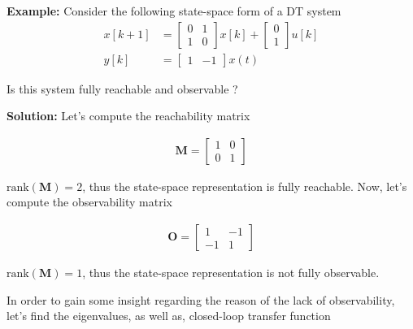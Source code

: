 \documentclass[twoside]{article}
\begin{document}
\newpage

\textbf{Example:} Consider the following state-space form of a
DT system 
%
\begin{align*}
x[k+1] &= 
\left[ \begin{array}{cc} 0 & 1 \\ 1 & 0 \end{array} \right]
x[k]
+
\left[ \begin{array}{c} 0 \\ 1 \end{array} \right] u[k]
\\
y[k] &= \left[ \begin{array}{cc} 1 & -1 \end{array} \right] x(t)
\end{align*}

Is this system fully reachable and observable ?

\textbf{Solution:} Let's compute the reachability matrix 

\begin{align*}
  \mathbf{M} = \left[ \begin{array}{cc} 1 & 0 \\ 0 & 1 \end{array} \right]
\end{align*}

$\mathrm{rank}( \mathbf{M} ) = 2$, thus the state-space representation
is fully reachable. Now, let's compute the observability matrix

\begin{align*}
  \mathbf{O} = \left[ \begin{array}{cc} 1 & -1 \\ -1 & 1 \end{array} \right]
\end{align*} 

$\mathrm{rank}( \mathbf{M} ) = 1$, thus the state-space representation
is not fully observable.

In order to gain some insight regarding the reason of the lack of
observability, let's find the eigenvalues, as well as, closed-loop
transfer function
\end{document}
